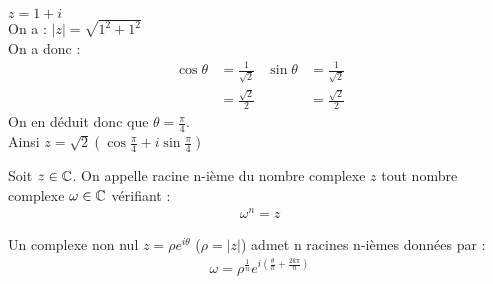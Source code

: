 \begin{exemple}
        $z = 1 + i$
        \\
        On a : $|z| = \sqrt{1^2 + 1^2}$
        \\
        On a donc :
        \begin{align*}
            \cos{\theta} &= \frac{1}{\sqrt{2}} & \sin{\theta} &= \frac{1}{\sqrt{2}} \\
                         &= \frac{\sqrt{2}}{2} &              &= \frac{\sqrt{2}}{2}
        \end{align*}
        On en déduit donc que $\theta = \frac{\pi}{4}$. \\
        Ainsi $z = \sqrt{2}\left(\cos{\frac{\pi}{4}} + i\sin{\frac{\pi}{4}}\right)$
    \end{exemple}



    \begin{definition}
    Soit $z \in \mathbb{C}$. On appelle racine n-ième du nombre complexe $z$ tout nombre complexe $\omega \in \mathbb{C}$ vérifiant :
    \begin{align*}
        \omega^n = z 
    \end{align*}
\end{definition}

\begin{proposition}
Un complexe non nul $z = \rho e^{i\theta}$ ($\rho = |z|$) admet n racines n-ièmes données par :
    \begin{align*}
        \omega = \rho^{\frac{1}{n}} e^{i\left(\frac{\theta}{n} + \frac{2k\pi}{n} \right)} 
    \end{align*}
\end{proposition}

